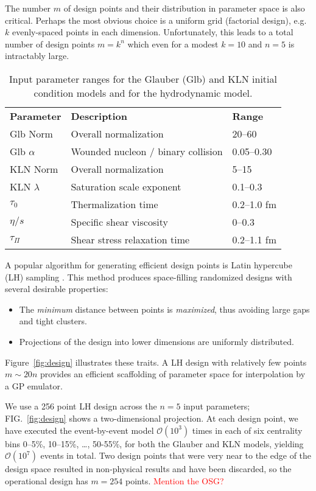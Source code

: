 \documentclass[aps,prc,reprint,amsmath]{revtex4-1}
\newcommand{\todo}[1]{\textcolor{red}{#1}}
\begin{document}
The number $m$ of design points and their distribution in parameter space is also critical.
Perhaps the most obvious choice is a uniform grid (factorial design), e.g.\ $k$ evenly-spaced points in each dimension.
Unfortunately, this leads to a total number of design points $m = k^n$ which even for a modest $k = 10$ and $n = 5$ is intractably large.

\begin{table}[b]
  \caption{
    \label{tab:design}
    Input parameter ranges for the Glauber (Glb) and KLN initial condition models and for the hydrodynamic model.
  }
  \begin{ruledtabular}
  \begin{tabular}{lll}
    \bf Parameter & \bf Description & \bf Range \\
    Glb Norm & Overall normalization & 20--60 \\
    Glb $\alpha$ & Wounded nucleon / binary collision & 0.05--0.30 \\
    KLN Norm & Overall normalization & 5--15 \\
    KLN $\lambda$ & Saturation scale exponent & 0.1--0.3 \\
    $\tau_0$ & Thermalization time & 0.2--1.0 fm \\
    $\eta/s$ & Specific shear viscosity & 0--0.3 \\
    $\tau_\Pi$ & Shear stress relaxation time & 0.2--1.1 fm \\
  \end{tabular}
  \end{ruledtabular}
\end{table}

A popular algorithm for generating efficient design points is Latin hypercube (LH) sampling \cite{Tang:1993lh}.
This method produces space-filling randomized designs with several desirable properties:
\begin{itemize}
  \item The \emph{minimum} distance between points is \emph{maximized}, thus avoiding large gaps and tight clusters.
  \item Projections of the design into lower dimensions are uniformly distributed.
\end{itemize}
Figure~\ref{fig:design} illustrates these traits.
A LH design with relatively few points $m \sim 20n$ provides an efficient scaffolding of parameter space for interpolation by a GP emulator.

We use a 256 point LH design across the $n = 5$ input parameters; FIG.~\ref{fig:design} shows a two-dimensional projection.
At each design point, we have executed the event-by-event model $\mathcal O(10^3)$ times in each of six centrality bins 0--5\%, 10--15\%, \ldots, 50-55\%, for both the Glauber and KLN models, yielding $\mathcal O(10^7)$ events in total.
Two design points that were very near to the edge of the design space resulted in non-physical results and have been discarded, so the operational design has $m = 254$ points.
\todo{Mention the OSG?}
\end{document}
